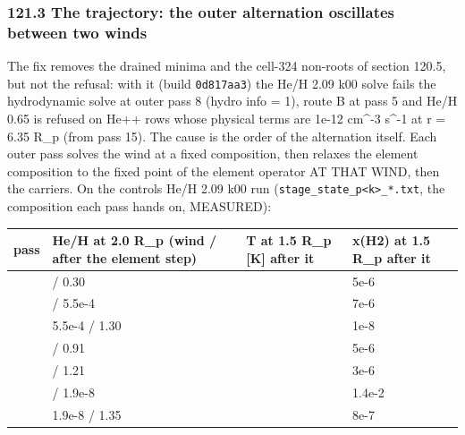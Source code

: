 \documentclass[english,a4paper]{my_memo}
\begin{document}
\subsubsection{121.3 The trajectory: the outer alternation oscillates between two winds}\label{1213-the-trajectory-the-outer-alternation-oscillates-between-two-winds}

The fix removes the drained minima and the cell-324 non-roots of section
120.5, but not the refusal: with it (build \texttt{0d817aa3}) the He/H 2.09 k00
solve fails the hydrodynamic solve at outer pass 8 (hydro info = 1), route
B at pass 5 and He/H 0.65 is refused on He++ rows whose physical terms are
1e-12 cm\^{}-3 s\^{}-1 at r = 6.35 R\_p (from pass 15). The cause is the order of
the alternation itself. Each outer pass solves the wind at a fixed
composition, then relaxes the element composition to the fixed point of the
element operator AT THAT WIND, then the carriers. On the control\textquotesingle s He/H 2.09
k00 run (\texttt{stage\_state\_p\textless{}k\textgreater{}\_*.txt}, the composition each pass hands on, MEASURED):

{\def\LTcaptype{none} %
{\small
\begin{longtable}[]{@{}>{\raggedright\arraybackslash}p{\dimexpr(\linewidth-8\tabcolsep)/4\relax}>{\raggedright\arraybackslash}p{\dimexpr(\linewidth-8\tabcolsep)/4\relax}>{\raggedright\arraybackslash}p{\dimexpr(\linewidth-8\tabcolsep)/4\relax}>{\raggedright\arraybackslash}p{\dimexpr(\linewidth-8\tabcolsep)/4\relax}@{}}
\toprule\noalign{}
pass & He/H at 2.0 R\_p (wind / after the element step) & T at 1.5 R\_p {[}K{]} after it & x(H2) at 1.5 R\_p after it \\
\midrule\noalign{}
\endhead
\bottomrule\noalign{}
\endlastfoot
1 & 0.50 / 0.30 & 3783 & 5e-6 \\
3 & 0.19 / 5.5e-4 & 1824 & 7e-6 \\
4 & 5.5e-4 / 1.30 & 10008 & 1e-8 \\
5 & 1.30 / 0.91 & 4473 & 5e-6 \\
6 & 0.91 / 1.21 & 5272 & 3e-6 \\
7 & 1.21 / 1.9e-8 & 1321 & 1.4e-2 \\
8 & 1.9e-8 / 1.35 & 7794 & 8e-7 \\
\end{longtable}
}
}
\end{document}
